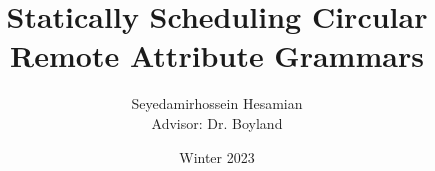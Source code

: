 \newcommand{\theadvisor}{{Dr. Boyland}}
\newcommand{\theuniversity}{{University of Wisconsin-Milwaukee}}
\newcommand{\theyear}{{2021}}

\author[Seyedamirhossein Hesamian]{Seyedamirhossein Hesamian \texorpdfstring{\\{\small Advisor: Dr. Boyland}}{}}

\title{Statically Scheduling Circular Remote Attribute Grammars}
\date{Winter 2023}
